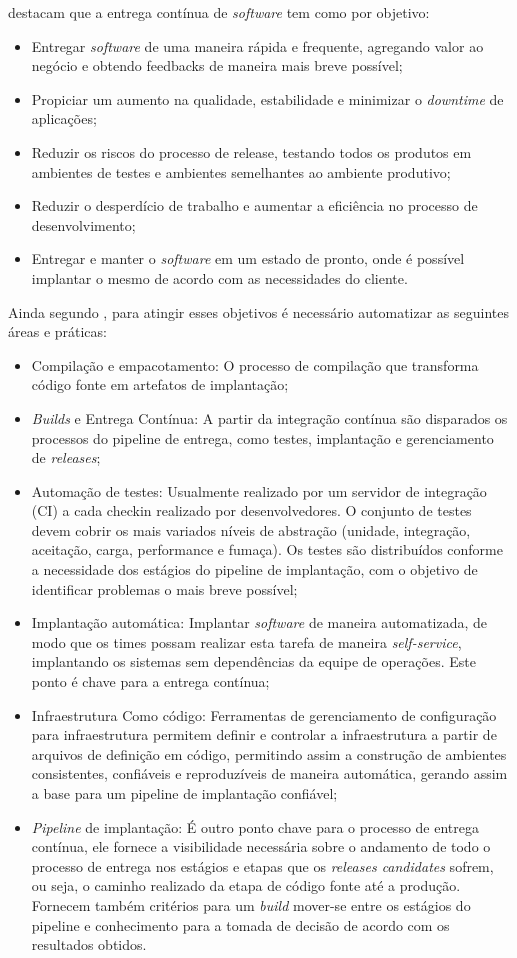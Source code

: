 \documentclass[twoside,english,brazilian]{UNISINOSartigo}
\begin{document}
 destacam que a entrega contínua de \textit{software} tem como por objetivo:
\begin{itemize}
\item Entregar \textit{software} de uma maneira rápida e frequente, agregando valor ao negócio e obtendo feedbacks de maneira mais breve possível;
\item Propiciar um aumento na qualidade, estabilidade  e minimizar o \textit{downtime} de aplicações;
\item Reduzir os riscos do processo de release, testando todos os produtos em ambientes de testes e ambientes semelhantes ao ambiente produtivo;
\item Reduzir o desperdício de trabalho e aumentar a eficiência no processo de desenvolvimento;
\item Entregar e manter o \textit{software} em um estado de pronto, onde é possível implantar o mesmo de acordo com as necessidades do cliente.
\end{itemize}
Ainda segundo , para atingir esses objetivos é  necessário automatizar as seguintes áreas e práticas:
\begin{itemize}
\item  Compilação e empacotamento: O processo de compilação que transforma código fonte em artefatos de implantação;
\item  \textit{Builds} e Entrega Contínua: A partir da integração contínua são disparados os processos do pipeline de entrega, como testes, implantação e gerenciamento de \textit{releases};
\item Automação de testes: Usualmente realizado por um servidor de integração (CI) a cada checkin realizado por desenvolvedores. O conjunto de testes devem cobrir os mais variados níveis de abstração (unidade, integração, aceitação, carga, performance e fumaça). Os testes são distribuídos conforme a necessidade dos estágios do pipeline de implantação, com o objetivo de identificar problemas o mais breve possível;
\item Implantação automática: Implantar \textit{software} de maneira automatizada, de modo que os times possam realizar esta tarefa de maneira \textit{self-service}, implantando os sistemas sem dependências da equipe de operações. Este ponto é chave para a entrega contínua;
\item Infraestrutura Como  código: Ferramentas de gerenciamento de configuração para infraestrutura permitem definir e controlar a infraestrutura a partir de arquivos de definição em código, permitindo assim a construção de ambientes consistentes, confiáveis e reproduzíveis de maneira automática, gerando assim a base para um pipeline de implantação confiável;
\item \textit{Pipeline} de implantação: É outro ponto chave para o processo de entrega contínua, ele fornece a visibilidade necessária sobre o andamento de todo o processo de entrega nos estágios e etapas que os \textit{releases candidates} sofrem, ou seja, o caminho realizado da etapa de código fonte até a produção. Fornecem também critérios para um \textit{build} mover-se entre os estágios do pipeline e conhecimento para a tomada de decisão de acordo com os resultados obtidos.
\end{itemize}
\end{document}
